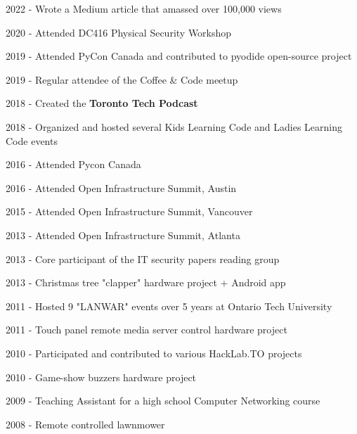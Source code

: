 \documentclass[margin,line]{resume}
\begin{document}
\begin{resume}
    \begin{list2}
        \item 2022 - Wrote a Medium article that amassed over 100,000 views
        \item 2020 - Attended DC416 Physical Security Workshop
        \item 2019 - Attended PyCon Canada and contributed to pyodide open-source project
        \item 2019 - Regular attendee of the Coffee \& Code meetup
        \item 2018 - Created the \textbf{Toronto Tech Podcast}
        \item 2018 - Organized and hosted several Kids Learning Code and Ladies Learning Code events
        \item 2016 - Attended Pycon Canada
        \item 2016 - Attended Open Infrastructure Summit, Austin
        \item 2015 - Attended Open Infrastructure Summit, Vancouver
        \item 2013 - Attended Open Infrastructure Summit, Atlanta
        \item 2013 - Core participant of the IT security papers reading group
        \item 2013 - Christmas tree "clapper" hardware project + Android app
        \item 2011 - Hosted 9 "LANWAR" events over 5 years at Ontario Tech University
        \item 2011 - Touch panel remote media server control hardware project
        \item 2010 - Participated and contributed to various HackLab.TO projects
        \item 2010 - Game-show buzzers hardware project
        \item 2009 - Teaching Assistant for a high school Computer Networking course
        \item 2008 - Remote controlled lawnmower
    \end{list2}\vspace{-1.5mm}


\end{resume}
\end{document}
